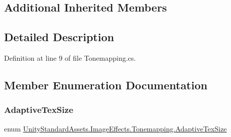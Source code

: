 \subsection*{Additional Inherited Members}


\subsection{Detailed Description}


Definition at line 9 of file Tonemapping.\+cs.



\subsection{Member Enumeration Documentation}
\mbox{\label{class_unity_standard_assets_1_1_image_effects_1_1_tonemapping_affa06af2bce28037fc1882c70b7b2131}} 
\subsubsection{\texorpdfstring{Adaptive\+Tex\+Size}{AdaptiveTexSize}}
{\footnotesize\ttfamily enum \mbox{\hyperlink{class_unity_standard_assets_1_1_image_effects_1_1_tonemapping_affa06af2bce28037fc1882c70b7b2131}{Unity\+Standard\+Assets.\+Image\+Effects.\+Tonemapping.\+Adaptive\+Tex\+Size}}\hspace{0.3cm}{\ttfamily [strong]}}


